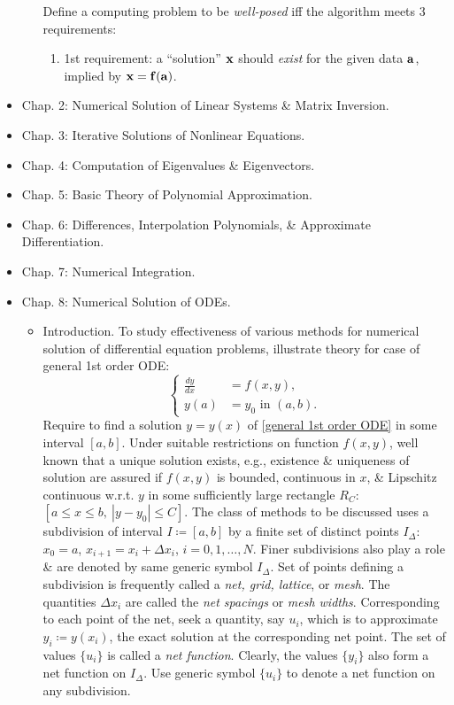 \documentclass{article}
\begin{document}
\begin{itemize}
\begin{itemize}
		Define a computing problem to be {\it well-posed} iff the algorithm meets 3 requirements:
		\begin{enumerate}
			\item 1st requirement: a ``solution'' $\bf x$ should {\it exist} for the given data $\bf a$, implied by ${\bf x} = {\bf f}({\bf a})$.
		\end{enumerate}
	\end{itemize}
	\item {\sf Chap. 2: Numerical Solution of Linear Systems \& Matrix Inversion.}
	\item {\sf Chap. 3: Iterative Solutions of Nonlinear Equations.}
	\item {\sf Chap. 4: Computation of Eigenvalues \& Eigenvectors.}
	\item {\sf Chap. 5: Basic Theory of Polynomial Approximation.}
	\item {\sf Chap. 6: Differences, Interpolation Polynomials, \& Approximate Differentiation.}
	\item {\sf Chap. 7: Numerical Integration.}
	\item {\sf Chap. 8: Numerical Solution of ODEs.}
	\begin{itemize}
		\item {\sf Introduction.} To study effectiveness of various methods for numerical solution of differential equation problems, illustrate theory for case of general 1st order ODE:
		\begin{equation}
			\label{general 1st order ODE}
			\tag{g1ODE}
			\left\{\begin{split}
				\frac{dy}{dx} &= f(x,y),\\
				y(a) &= y_0\mbox{ in }(a,b).
			\end{split}\right.
		\end{equation}
		Require to find a solution $y = y(x)$ of \eqref{general 1st order ODE} in some interval $[a,b]$. Under suitable restrictions on function $f(x,y)$, well known that a unique solution exists, e.g., existence \& uniqueness of solution are assured if $f(x,y)$ is bounded, continuous in $x$, \& Lipschitz continuous w.r.t. $y$ in some sufficiently large rectangle $R_C$: $[a\le x\le b,\ |y - y_0|\le C]$. The class of methods to be discussed uses a subdivision of interval $I\coloneqq[a,b]$ by a finite set of distinct points $I_\Delta$: $x_0 = a$, $x_{i+1} = x_i + \Delta x_i$, $i = 0,1,\ldots,N$. Finer subdivisions also play a role \& are denoted by same generic symbol $I_\Delta$. Set of points defining a subdivision is frequently called a {\it net, grid, lattice}, or {\it mesh}. The quantities $\Delta x_i$ are called the {\it net spacings} or {\it mesh widths}. Corresponding to each point of the net, seek a quantity, say $u_i$, which is to approximate $y_i\coloneqq y(x_i)$, the exact solution at the corresponding net point. The set of values $\{u_i\}$ is called a {\it net function}. Clearly, the values $\{y_i\}$ also form a net function on $I_\Delta$. Use generic symbol $\{u_i\}$ to denote a net function on any subdivision.
		

\end{itemize}
\end{itemize}
\end{document}
